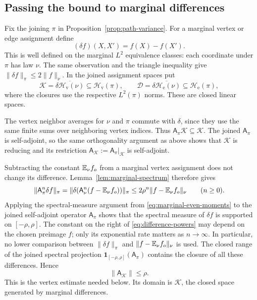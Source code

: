 \subsection{Passing the bound to marginal differences}

Fix the joining \(\pi\) in Proposition~\ref{prop:path-variance}.
For a marginal vertex or edge assignment define
\[
 (\delta f)(X,X')=f(X)-f(X').
\]
This is well defined on the marginal \(L^2\) equivalence classes:
each coordinate under \(\pi\) has law \(\nu\).  The same observation
and the triangle inequality give
\(\|\delta f\|_\pi\le2\|f\|_\nu\).  In the joined assignment spaces
put
\[
 \mathcal K=
 \overline{\delta\mathcal H_{\mathrm v}(\nu)}
 \subseteq\mathcal H_{\mathrm v}(\pi),\qquad
 \mathcal D=
 \overline{\delta\mathcal H_{\mathrm e}(\nu)}
 \subseteq\mathcal H_{\mathrm e}(\pi),
\]
where the closures use the respective \(L^2(\pi)\) norms.
These are closed linear spaces.

The vertex neighbor averages for \(\nu\) and \(\pi\) commute with
\(\delta\), since they use the same finite sums over neighboring
vertex indices.  Thus \(\mathsf A_\pi\mathcal K\subseteq\mathcal K\).
The joined \(\mathsf A_\pi\) is self-adjoint, so the same
orthogonality argument as above shows that \(\mathcal K\) is
reducing and its restriction
\(\mathsf A_{\mathcal K}:=\mathsf A_\pi|_{\mathcal K}\) is
self-adjoint.

Subtracting the constant \(\mathbb E_\nu f_o\) from a marginal vertex
assignment does not change its difference.  Lemma~\ref{lem:marginal-spectrum}
therefore gives
\begin{equation}
\label{eq:difference-powers}
 \|\mathsf A_\pi^n\delta f\|_\pi
 =\|\delta(\mathsf A_\nu^n(f-\mathbb E_\nu f_o))\|_\pi
 \le2\rho^n\|f-\mathbb E_\nu f_o\|_\nu
 \qquad(n\ge0).
\end{equation}
Applying the spectral-measure argument from
\eqref{eq:marginal-even-moments} to the joined self-adjoint
operator \(\mathsf A_\pi\) shows that the spectral measure of \(\delta f\) is
supported on \([-\rho,\rho]\).  The constant on the right of
\eqref{eq:difference-powers} may depend on the chosen preimage
\(f\); only its exponential rate matters as \(n\to\infty\).
In particular, no lower comparison between
\(\|\delta f\|_\pi\) and \(\|f-\mathbb E_\nu f_o\|_\nu\) is used.
The closed range of the joined spectral projection
\(\mathbf 1_{[-\rho,\rho]}(\mathsf A_\pi)\) contains the closure of
all these differences.  Hence
\begin{equation}
\label{eq:difference-spectrum}
 \|\mathsf A_{\mathcal K}\|\le\rho.
\end{equation}
This is the vertex estimate needed below.  Its domain is
\(\mathcal K\), the closed space generated by marginal differences.

